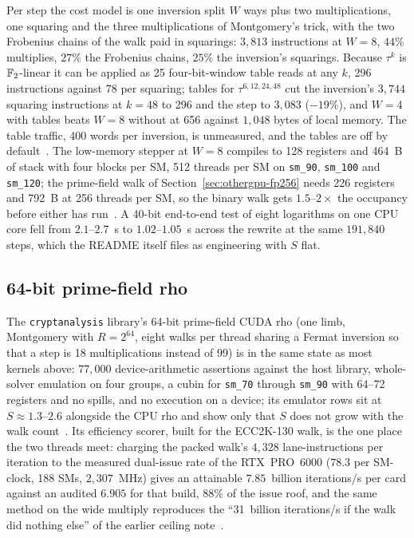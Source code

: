 Per step the cost model is one inversion split $W$ ways plus two
multiplications, one squaring and the three multiplications of
Montgomery's trick, with the two Frobenius chains of the walk paid in
squarings: $3{,}813$ instructions at $W=8$, $44\%$ multiplies, $27\%$
the Frobenius chains, $25\%$ the inversion's squarings. Because
$\tau^k$ is $\mathbb{F}_2$-linear it can be applied as 25 four-bit-window
table reads at any $k$, 296 instructions against 78 per squaring;
tables for $\tau^{6,12,24,48}$ cut the inversion's $3{,}744$
squaring instructions at $k=48$ to 296 and the step to $3{,}083$
($-19\%$), and $W=4$ with tables beats $W=8$ without at 656 against
$1{,}048$ bytes of local memory. The table traffic, 400 words per
inversion, is unmeasured, and the tables are off by
default~.
The low-memory stepper at $W=8$ compiles to 128 registers and 464~B
of stack with four blocks per SM, 512 threads per SM on
\texttt{sm\_90}, \texttt{sm\_100} and \texttt{sm\_120}; the
prime-field walk of Section~\ref{sec:othergpu-fp256} needs 226
registers and 792~B at 256 threads per SM, so the binary walk gets
$1.5$--$2\times$ the occupancy before either has run~.
A 40-bit end-to-end test of eight logarithms on one CPU core fell
from $2.1$--$2.7$~s to $1.02$--$1.05$~s across the rewrite at the same
$191{,}840$ steps, which the README itself files as engineering with
$S$ flat.

\subsection{64-bit prime-field rho}
\label{sec:othergpu-prho64}

The \texttt{cryptanalysis} library's 64-bit prime-field CUDA rho (one limb, Montgomery
with $R=2^{64}$, eight walks per thread sharing a Fermat inversion so
that a step is 18 multiplications instead of 99) is in the same
state as most kernels above: $77{,}000$ device-arithmetic assertions
against the host library, whole-solver emulation on four groups, a
cubin for \texttt{sm\_70} through \texttt{sm\_90} with 64--72 registers
and no spills, and no execution on a device; its emulator rows sit at
$S\approx1.3$--$2.6$ alongside the CPU rho and show only that $S$ does
not grow with the walk count~.
Its efficiency scorer, built for the ECC2K-130 walk, is the one place
the two threads meet: charging the packed walk's $4{,}328$
lane-instructions per iteration to the measured dual-issue rate of
the RTX~PRO~6000 ($78.3$ per SM-clock, 188 SMs, $2{,}307$~MHz) gives
an attainable $7.85$~billion iterations/s per card against an audited $6.905$ for that
build, $88\%$ of the issue roof, and the same method on the wide
multiply reproduces the ``31~billion iterations/s if the walk did nothing else''
of the earlier ceiling note~.

